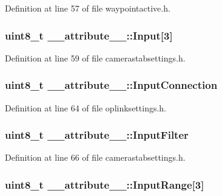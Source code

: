 \-Definition at line 57 of file waypointactive.\-h.

\hypertarget{struct____attribute_____a7d81963193cb97763c41a895ce04c60f}{
\subsubsection[{\-Input}]{\setlength{\rightskip}{0pt plus 5cm}uint8\-\_\-t {\bf \-\_\-\-\_\-attribute\-\_\-\-\_\-\-::\-Input}\mbox{[}3\mbox{]}}}\label{struct____attribute_____a7d81963193cb97763c41a895ce04c60f}


\-Definition at line 59 of file camerastabsettings.\-h.

\hypertarget{struct____attribute_____aef2ee3a1d1a9e1de72708746056a5cea}{
\subsubsection[{\-Input\-Connection}]{\setlength{\rightskip}{0pt plus 5cm}uint8\-\_\-t {\bf \-\_\-\-\_\-attribute\-\_\-\-\_\-\-::\-Input\-Connection}}}\label{struct____attribute_____aef2ee3a1d1a9e1de72708746056a5cea}


\-Definition at line 64 of file oplinksettings.\-h.

\hypertarget{struct____attribute_____a77da07d5a4b8176a7ea291dda3f87170}{
\subsubsection[{\-Input\-Filter}]{\setlength{\rightskip}{0pt plus 5cm}uint8\-\_\-t {\bf \-\_\-\-\_\-attribute\-\_\-\-\_\-\-::\-Input\-Filter}}}\label{struct____attribute_____a77da07d5a4b8176a7ea291dda3f87170}


\-Definition at line 66 of file camerastabsettings.\-h.

\hypertarget{struct____attribute_____acc52565138c477dc20d1050ed4cd6084}{
\subsubsection[{\-Input\-Range}]{\setlength{\rightskip}{0pt plus 5cm}uint8\-\_\-t {\bf \-\_\-\-\_\-attribute\-\_\-\-\_\-\-::\-Input\-Range}\mbox{[}3\mbox{]}}}\label{struct____attribute_____acc52565138c477dc20d1050ed4cd6084}


